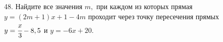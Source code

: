 48. Найдите все значения $m,$ при каждом из которых прямая $y=(2m+1)x+1-4m$ проходит через точку пересечения прямых $y=\cfrac{x}{3}-8,5$ и $y=-6x+20.$\\
